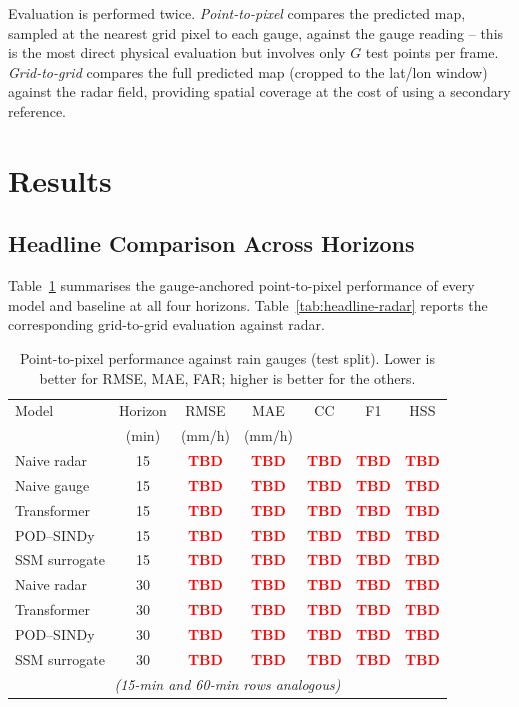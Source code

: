 \documentclass[conference]{IEEEtran}
\newcommand{\tbd}{\textcolor{red}{\textbf{TBD}}}
\begin{document}
Evaluation is performed twice. \emph{Point-to-pixel} compares the
predicted map, sampled at the nearest grid pixel to each gauge, against
the gauge reading -- this is the most direct physical evaluation but
involves only $G$ test points per frame. \emph{Grid-to-grid} compares
the full predicted map (cropped to the lat/lon window) against the
radar field, providing spatial coverage at the cost of using a
secondary reference.

\section{Results}
\label{sec:results}

\subsection{Headline Comparison Across Horizons}

Table~\ref{tab:headline-gauges} summarises the gauge-anchored
point-to-pixel performance of every model and baseline at all four
horizons. Table~\ref{tab:headline-radar} reports the corresponding
grid-to-grid evaluation against radar.

\begin{table}[t]
\centering
\caption{Point-to-pixel performance against rain gauges (test split).
Lower is better for RMSE, MAE, FAR; higher is better for the others.}
\label{tab:headline-gauges}
\begin{tabular}{l c c c c c c}
\toprule
Model & Horizon & RMSE & MAE & CC & F1 & HSS \\
      & (min)   & (mm/h) & (mm/h) & & & \\
\midrule
Naive radar    & 15 & \tbd & \tbd & \tbd & \tbd & \tbd \\
Naive gauge    & 15 & \tbd & \tbd & \tbd & \tbd & \tbd \\
Transformer    & 15 & \tbd & \tbd & \tbd & \tbd & \tbd \\
POD--SINDy     & 15 & \tbd & \tbd & \tbd & \tbd & \tbd \\
SSM surrogate  & 15 & \tbd & \tbd & \tbd & \tbd & \tbd \\
\midrule
Naive radar    & 30 & \tbd & \tbd & \tbd & \tbd & \tbd \\
Transformer    & 30 & \tbd & \tbd & \tbd & \tbd & \tbd \\
POD--SINDy     & 30 & \tbd & \tbd & \tbd & \tbd & \tbd \\
SSM surrogate  & 30 & \tbd & \tbd & \tbd & \tbd & \tbd \\
\midrule
\multicolumn{7}{c}{\emph{(15-min and 60-min rows analogous)}}\\
\bottomrule
\end{tabular}
\end{table}
\end{document}
